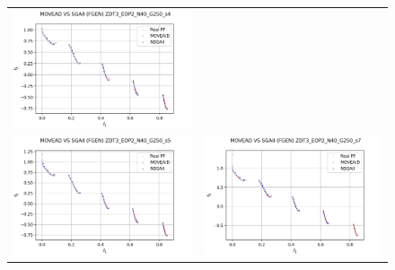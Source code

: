 \begin{figure}[H]
\begin{tabular}{c c}
    \includegraphics[scale=0.5]{figures/ZDT3_EOP2_N40_G250_T6/s4_comp.png}\\
    \includegraphics[scale=0.5]{figures/ZDT3_EOP2_N40_G250_T6/s5_comp.png} &
    \includegraphics[scale=0.5]{figures/ZDT3_EOP2_N40_G250_T6/s7_comp.png}\\

\end{tabular}
\end{figure}
